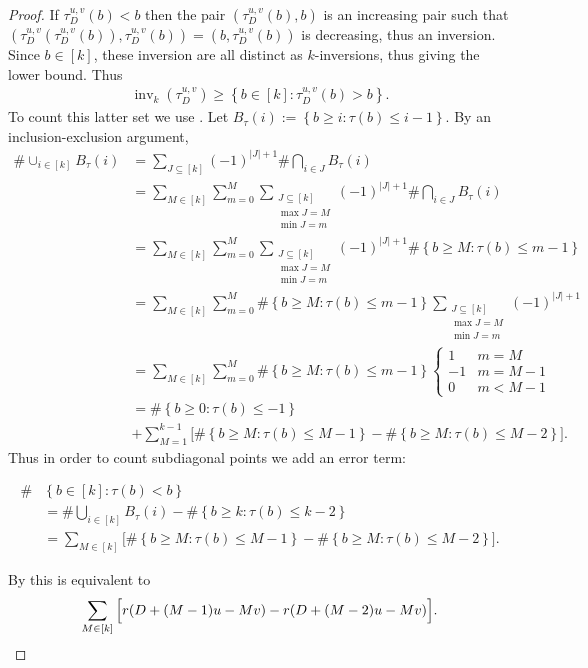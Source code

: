 \documentclass[11pt]{article}
\theoremstyle{definition}
\numberwithin{equation}{section}
\newcommand{\inv}{\operatorname{inv}}
\newcommand{\set}[1]{\left\{{#1}\right\}}
\newcommand{\tauD}{\tau^{u,v}_D}
\begin{document}
\begin{proof}
    If $\tauD(b)<b$ then the pair $(\tauD(b),b)$ is an increasing pair such that $(\tauD(\tauD(b)),\tauD(b)) = (b,\tauD(b))$ is decreasing, thus an inversion. Since $b \in [k]$, these inversion are all distinct as $k$-inversions, thus giving the lower bound. Thus
    \begin{align*}
        \inv_k(\tauD) \geq \set{b \in [k]:\tauD(b)>b}.
    \end{align*}
    To count this latter set we use . Let $B_\tau(i):= \set{b\geq i :\tau(b)\leq i-1}$. By an inclusion-exclusion argument,
    \begin{align*}
         \#\cup_{i \in [k]} B_\tau(i) &= \sum_{J \subseteq [k]}(-1)^{|J|+1}\#\bigcap_{i \in J} B_\tau(i)\\
         &=\sum_{M \in [k]}\sum_{m = 0}^M\sum_{\substack{J \subseteq [k]\\ \max{J} = M\\
         \min{J} = m}}(-1)^{|J|+1}\#\bigcap_{i \in J} B_\tau(i)\\
         &=\sum_{M \in [k]}\sum_{m = 0}^M\sum_{\substack{J \subseteq [k]\\ \max{J} = M\\
         \min{J} = m}}(-1)^{|J|+1}\# \set{b \geq M:\tau(b) \leq m-1}\\
         &=\sum_{M \in [k]}\sum_{m = 0}^M\# \set{b \geq M:\tau(b) \leq m-1}\sum_{\substack{J \subseteq [k]\\ \max{J} = M\\
         \min{J} = m}}(-1)^{|J|+1}\\
         &=\sum_{M \in [k]}\sum_{m = 0}^M\# \set{b \geq M:\tau(b) \leq m-1}\begin{cases}
             1 & m = M\\
             -1 & m = M-1\\
             0 & m<M-1
         \end{cases}\\
         &= \#\set{b\geq 0:\tau(b)\leq -1} \\&+ \sum_{M = 1}^{k-1} \Big[ \#\set{b \geq M :\tau(b) \leq M-1}-\# \set{b \geq M:\tau(b) \leq M-2} \Big].
    \end{align*}
    Thus in order to count subdiagonal points we add an error term:
    
    \begin{align*}
        \# &\set{b \in [k]:\tau(b)<b} \\
        &= \#\bigcup_{i \in [k]} B_\tau(i) - \#\set{b \geq k:\tau(b) \leq k-2}\\
        &=\sum_{M \in [k]} \Big[ \#\set{b \geq M :\tau(b) \leq M-1}-\# \set{b \geq M:\tau(b) \leq M-2}\Big].
    \end{align*} 
    
    By  this is equivalent to
    \[
        \sum_{M \in [k]} \Big[ r(D+(M-1)u-Mv) - r(D+(M-2)u-Mv) \Big]. \qedhere
        \]
\end{proof}
\end{document}
